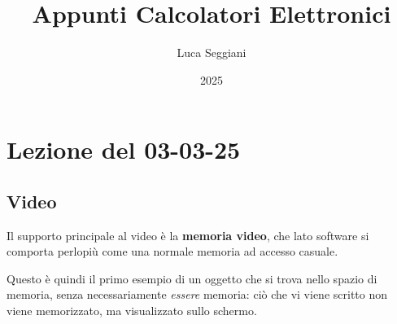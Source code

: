 \documentclass[a4paper,11pt]{article}
\title{Appunti Calcolatori Elettronici}
\author{Luca Seggiani}
\date{2025}
\begin{document}
\section{Lezione del 03-03-25}

\thispagestyle{empty}
\pagestyle{fancy}

\subsection{Video}
Il supporto principale al video è la \textbf{memoria video}, che lato software si comporta perlopiù come una normale memoria ad accesso casuale.

Questo è quindi il primo esempio di un oggetto che si trova nello spazio di memoria, senza necessariamente \textit{essere} memoria: ciò che vi viene scritto non viene memorizzato, ma visualizzato sullo schermo.
\end{document}
